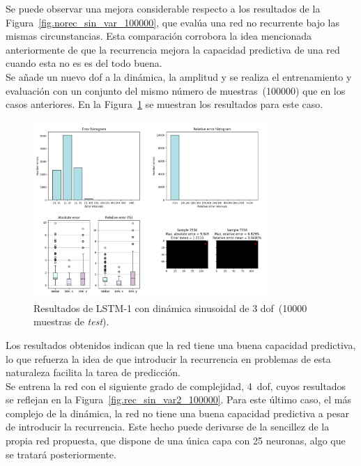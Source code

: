 Se puede observar una mejora considerable respecto a los resultados de la Figura~\ref{fig.norec_sin_var_100000}, que evalúa una red no recurrente bajo las mismas circunstancias. Esta comparación corrobora la idea mencionada anteriormente de que la recurrencia mejora la capacidad predictiva de una red cuando esta no es es del todo buena.\\

Se añade un nuevo \acrshort{dof} a la dinámica, la amplitud y se realiza el entrenamiento y evaluación con un conjunto del mismo número de muestras~(100000) que en los casos anteriores. En la Figura~\ref{fig.rec_sin_var1_100000} se muestran los resultados para este caso.

\begin{figure}[H]
		\begin{center}
			\includegraphics[width=0.8\textwidth]{ figures/test_mod/REC/simple/sin_var1_100000.png}
			\caption{Resultados de LSTM-1 con dinámica sinusoidal de 3 \acrshort{dof}~(10000 muestras de \textit{test}).}
			\label{fig.rec_sin_var1_100000}
		\end{center}
\end{figure}
\vspace{-10pt}

Los resultados obtenidos indican que la red tiene una buena capacidad predictiva, lo que refuerza la idea de que introducir la recurrencia en problemas de esta naturaleza facilita la tarea de predicción.\\

Se entrena la red con el siguiente grado de complejidad, 4~\acrshort{dof}, cuyos resultados se reflejan en la Figura~\ref{fig.rec_sin_var2_100000}. Para este último caso, el más complejo de la dinámica, la red no tiene una buena capacidad predictiva a pesar de introducir la recurrencia. Este hecho puede derivarse de la sencillez de la propia red propuesta, que dispone de una única capa con 25 neuronas, algo que se tratará posteriormente.

